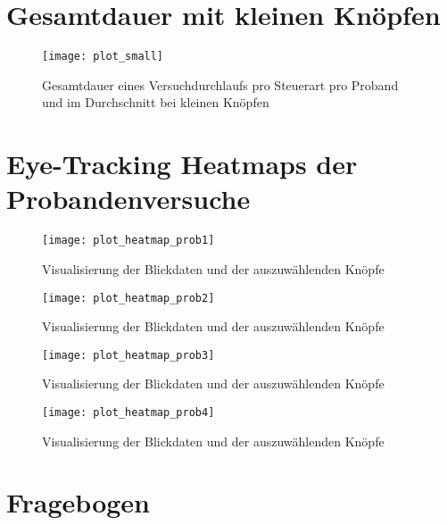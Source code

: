 \section{Gesamtdauer mit kleinen Knöpfen}
\label{appendix:timessmall}
\begin{figure}[!htbp]
	\centering
	\texttt{[image: plot\_small]}
	\caption[Gesamtdauer eines Versuchdurchlaufs pro Steuerart pro Proband und im Durchschnitt bei kleinen Knöpfen] {Gesamtdauer eines Versuchdurchlaufs pro Steuerart pro Proband und im Durchschnitt bei kleinen Knöpfen}
\end{figure}

\section{Eye-Tracking Heatmaps der Probandenversuche}
\label{appendix:heatmaps}
\begin{figure}[!htbp]
	\centering
	\texttt{[image: plot\_heatmap\_prob1]}
	\caption[Visualisierung der Blickdaten und der auszuwählenden Knöpfe] {Visualisierung der Blickdaten und der auszuwählenden Knöpfe}
\end{figure}
\begin{figure}[!htbp]
	\centering
	\texttt{[image: plot\_heatmap\_prob2]}
	\caption[Visualisierung der Blickdaten und der auszuwählenden Knöpfe] {Visualisierung der Blickdaten und der auszuwählenden Knöpfe}
\end{figure}
\begin{figure}[!htbp]
	\centering
	\texttt{[image: plot\_heatmap\_prob3]}
	\caption[Visualisierung der Blickdaten und der auszuwählenden Knöpfe] {Visualisierung der Blickdaten und der auszuwählenden Knöpfe}
\end{figure}
\begin{figure}[!htbp]
	\centering
	\texttt{[image: plot\_heatmap\_prob4]}
	\caption[Visualisierung der Blickdaten und der auszuwählenden Knöpfe] {Visualisierung der Blickdaten und der auszuwählenden Knöpfe}
\end{figure}

\section{Fragebogen}
